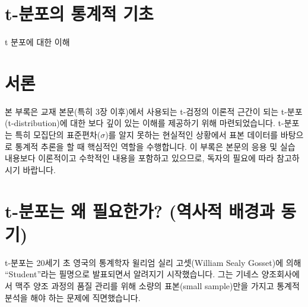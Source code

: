 \documentclass[
  letterpaper,
]{book}
\begin{document}
\chapter{}\label{section-9}

\chapter{}\label{section-10}

\chapter{}\label{section-11}

\cleardoublepage
{}
{}
\appendix

\chapter{t-분포의 통계적
기초}\label{t-uxbd84uxd3ecuxc758-uxd1b5uxacc4uxc801-uxae30uxcd08}

t 분포에 대한 이해

\hfill\break

\chapter{서론}\label{uxc11cuxb860}

본 부록은 교재 본문(특히 3장 이후)에서 사용되는 t-검정의 이론적 근간이
되는 t-분포(t-distribution)에 대한 보다 깊이 있는 이해를 제공하기 위해
마련되었습니다. t-분포는 특히 모집단의 표준편차(\(\sigma\))를 알지
못하는 현실적인 상황에서 표본 데이터를 바탕으로 통계적 추론을 할 때
핵심적인 역할을 수행합니다. 이 부록은 본문의 응용 및 실습 내용보다
이론적이고 수학적인 내용을 포함하고 있으므로, 독자의 필요에 따라
참고하시기 바랍니다.

\chapter{t-분포는 왜 필요한가? (역사적 배경과
동기)}\label{t-uxbd84uxd3ecuxb294-uxc65c-uxd544uxc694uxd55cuxac00-uxc5eduxc0acuxc801-uxbc30uxacbduxacfc-uxb3d9uxae30}

t-분포는 20세기 초 영국의 통계학자 윌리엄 실리 고셋(William Sealy
Gosset)에 의해 ``Student''라는 필명으로 발표되면서 알려지기
시작했습니다. 그는 기네스 양조회사에서 맥주 양조 과정의 품질 관리를 위해
소량의 표본(small sample)만을 가지고 통계적 분석을 해야 하는 문제에
직면했습니다.
\end{document}
